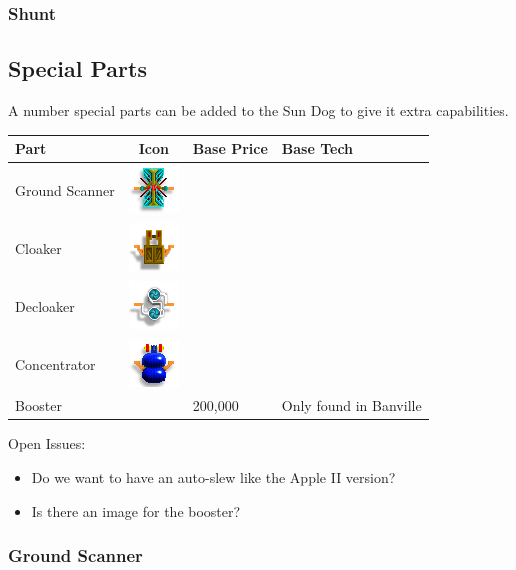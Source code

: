\subsubsection{Shunt}


\subsection{Special Parts}
A number special parts can be added to the Sun Dog to give it extra
capabilities.

\begin{tabular}{| l | c | l | l |}
\hline
Part & Icon & Base Price & Base Tech \\
\hline
Ground Scanner & \includegraphics[scale=0.70]{images/part-groundscanner.png} & & \\
Cloaker & \includegraphics[scale=0.70]{images/part-cloaker.png} & & \\
Decloaker & \includegraphics[scale=0.70]{images/part-decloaker.png} & & \\
Concentrator & \includegraphics[scale=0.70]{images/part-concentrator.png} & & \\
Booster & & 200,000 & Only found in Banville \\
\hline
\end{tabular}

Open Issues:
\begin{itemize}
\item Do we want to have an auto-slew like the Apple II version?
\item Is there an image for the booster?
\end{itemize}

\subsubsection{Ground Scanner}

